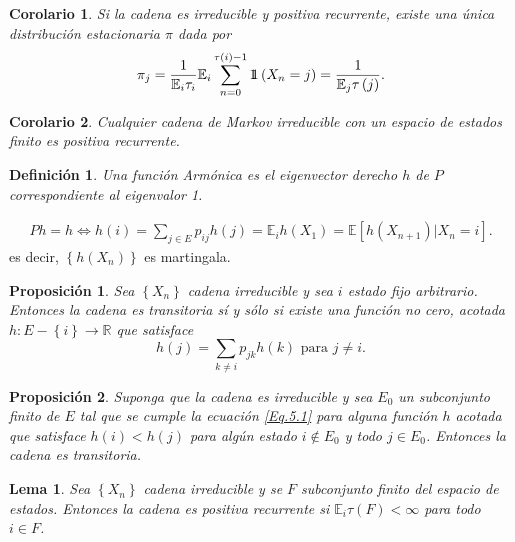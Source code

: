 \documentclass{article}
\newtheorem{Def}{Definición}[section]
\newtheorem{Prop}{Proposición}[section]
\newtheorem{Cor}{Corolario}[section]
\newtheorem{Lema}{Lema}[section]
\newcommand{\rea}{\mathbb{R}}
\newcommand{\esp}{\mathbb{E}}
\newcommand{\indora}{\mbox{$1$\hspace{-0.8ex}$1$}}
\numberwithin{equation}{section}
\begin{document}
\begin{Cor}\label{Cor.3.5}
Si la cadena es irreducible y positiva recurrente, existe una \'unica distribuci\'on estacionaria $\pi$ dada por
\begin{equation}
\pi_{j}=\frac{1}{\esp_{i}\tau_{i}}\esp_{i}\sum_{n=0}^{\tau\left(i\right)-1}\indora\left(X_{n}=j\right)=\frac{1}{\esp_{j}\tau\left(j\right)}.
\end{equation}
\end{Cor}

\begin{Cor}\label{Cor.3.6}
Cualquier cadena de Markov irreducible con un espacio de estados finito es positiva recurrente.
\end{Cor}

\begin{Def}\label{Def.Armonica}
Una funci\'on Arm\'onica es el eigenvector derecho $h$ de $P$ correspondiente al eigenvalor 1.
\end{Def}
\begin{eqnarray}
Ph=h\Leftrightarrow h\left(i\right)=\sum_{j\in E}p_{ij}h\left(j\right)=\esp_{i}h\left(X_{1}\right)=\esp\left[h\left(X_{n+1}\right)|X_{n}=i\right].
\end{eqnarray}
es decir, $\left\{h\left(X_{n}\right)\right\}$ es martingala.\\

\begin{Prop}\label{Prop.5.2}
Sea $\left\{X_{n}\right\}$ cadena irreducible  y sea $i$ estado fijo arbitrario. Entonces la cadena es transitoria s\'i y s\'olo si existe una funci\'on no cero, acotada $h:E-\left\{i\right\}\rightarrow\rea$ que satisface
\begin{equation}\label{Eq.5.1}
h\left(j\right)=\sum_{k\neq i}p_{jk}h\left(k\right)\textrm{   para }j\neq i.
\end{equation}
\end{Prop}

\begin{Prop}\label{Prop.5.4}
Suponga que la cadena es irreducible y sea $E_{0}$ un subconjunto finito de $E$ tal que se cumple la ecuaci\'on \ref{Eq.5.1} para alguna funci\'on $h$ acotada que satisface $h\left(i\right)<h\left(j\right)$ para alg\'un estado $i\notin E_{0}$ y todo $j\in E_{0}$. Entonces la cadena es transitoria.
\end{Prop}

\begin{Lema}
Sea $\left\{X_{n}\right\}$ cadena irreducible y se $F$ subconjunto finito del espacio de estados. Entonces la cadena es positiva recurrente si $\esp_{i}\tau\left(F\right)<\infty$ para todo $i\in F$.
\end{Lema}
\end{document}
